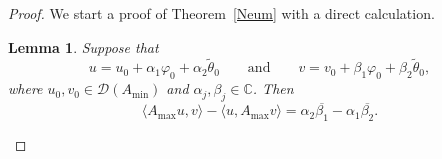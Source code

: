 \documentclass[pdftex]{sigma}%
\numberwithin{equation}{section}
\newtheorem{Lemma}[Theorem]{Lemma}
\begin{document}
 \begin{proof}
 We start a proof of Theorem~\ref{Neum} with a direct calculation.

 \begin{Lemma}\label{Neum1}
 Suppose that
 \begin{equation}
u=u_{0}+ \alpha_{1} \varphi_{0}+ \alpha_{2} \tilde{\theta}_{0 }\qquad\mbox{and}\qquad v=v_{0}+ \beta_{1} \varphi_{0}+ \beta_{2} \tilde{\theta}_{0 },
 \label{eq:Ne1}
 \end{equation}
 where $u_{0}, v_{0} \in {\mathcal D}(A_{\min})$ and $\alpha_{j}, \beta_{j}\in {\mathbb C}$. Then
 \begin{equation}
\langle A_{\max} u,v\rangle -\langle u, A_{\max} v\rangle = \alpha_{2} \overline{\beta_{1}}-\alpha_{1} \overline{\beta_{2}}.
 \label{eq:Ne6}\end{equation}
 \end{Lemma}


\end{proof}
\end{document}
